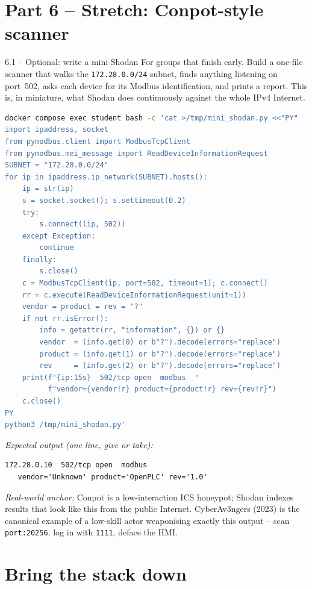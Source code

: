 \documentclass[11pt,a4paper]{article}
\begin{document}
\section*{Part 6 -- Stretch: Conpot-style scanner}

\begin{stepbox}{6.1 -- Optional: write a mini-Shodan}
For groups that finish early. Build a one-file scanner that walks
the \texttt{172.28.0.0/24} subnet, finds anything listening on
port~502, asks each device for its Modbus identification, and
prints a report. This is, in miniature, what Shodan does
continuously against the whole IPv4 Internet.
\begin{lstlisting}[language=bash]
docker compose exec student bash -c 'cat >/tmp/mini_shodan.py <<"PY"
import ipaddress, socket
from pymodbus.client import ModbusTcpClient
from pymodbus.mei_message import ReadDeviceInformationRequest
SUBNET = "172.28.0.0/24"
for ip in ipaddress.ip_network(SUBNET).hosts():
    ip = str(ip)
    s = socket.socket(); s.settimeout(0.2)
    try:
        s.connect((ip, 502))
    except Exception:
        continue
    finally:
        s.close()
    c = ModbusTcpClient(ip, port=502, timeout=1); c.connect()
    rr = c.execute(ReadDeviceInformationRequest(unit=1))
    vendor = product = rev = "?"
    if not rr.isError():
        info = getattr(rr, "information", {}) or {}
        vendor  = (info.get(0) or b"?").decode(errors="replace")
        product = (info.get(1) or b"?").decode(errors="replace")
        rev     = (info.get(2) or b"?").decode(errors="replace")
    print(f"{ip:15s}  502/tcp open  modbus  "
          f"vendor={vendor!r} product={product!r} rev={rev!r}")
    c.close()
PY
python3 /tmp/mini_shodan.py'
\end{lstlisting}
\textit{Expected output (one line, give or take):}
\begin{lstlisting}
172.28.0.10  502/tcp open  modbus
   vendor='Unknown' product='OpenPLC' rev='1.0'
\end{lstlisting}
\emph{Real-world anchor:} Conpot is a low-interaction ICS
honeypot; Shodan indexes results that look like this from the
public Internet. CyberAv3ngers (2023) is the canonical example
of a low-skill actor weaponising exactly this output -- scan
\texttt{port:20256}, log in with \texttt{1111}, deface the HMI.
\end{stepbox}

\section*{Bring the stack down}
\end{document}
